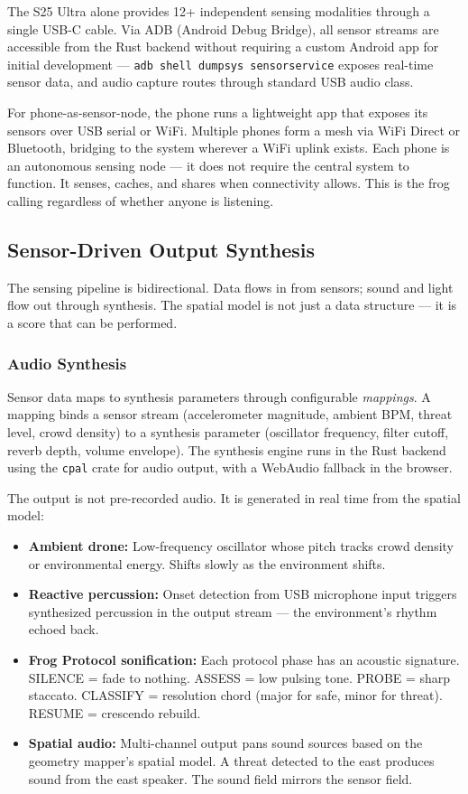 \documentclass[11pt,letterpaper]{article}
\begin{document}
The S25 Ultra alone provides 12+ independent sensing modalities through a single USB-C cable. Via ADB (Android Debug Bridge), all sensor streams are accessible from the Rust backend without requiring a custom Android app for initial development --- \texttt{adb shell dumpsys sensorservice} exposes real-time sensor data, and audio capture routes through standard USB audio class.

For phone-as-sensor-node, the phone runs a lightweight app that exposes its sensors over USB serial or WiFi. Multiple phones form a mesh via WiFi Direct or Bluetooth, bridging to the system wherever a WiFi uplink exists. Each phone is an autonomous sensing node --- it does not require the central system to function. It senses, caches, and shares when connectivity allows. This is the frog calling regardless of whether anyone is listening.

\subsection{Sensor-Driven Output Synthesis}

The sensing pipeline is bidirectional. Data flows in from sensors; sound and light flow out through synthesis. The spatial model is not just a data structure --- it is a score that can be performed.

\subsubsection{Audio Synthesis}

Sensor data maps to synthesis parameters through configurable \textit{mappings}. A mapping binds a sensor stream (accelerometer magnitude, ambient BPM, threat level, crowd density) to a synthesis parameter (oscillator frequency, filter cutoff, reverb depth, volume envelope). The synthesis engine runs in the Rust backend using the \texttt{cpal} crate for audio output, with a WebAudio fallback in the browser.

The output is not pre-recorded audio. It is generated in real time from the spatial model:

\begin{itemize}[leftmargin=2em]
\item \textbf{Ambient drone:} Low-frequency oscillator whose pitch tracks crowd density or environmental energy. Shifts slowly as the environment shifts.
\item \textbf{Reactive percussion:} Onset detection from USB microphone input triggers synthesized percussion in the output stream --- the environment's rhythm echoed back.
\item \textbf{Frog Protocol sonification:} Each protocol phase has an acoustic signature. SILENCE = fade to nothing. ASSESS = low pulsing tone. PROBE = sharp staccato. CLASSIFY = resolution chord (major for safe, minor for threat). RESUME = crescendo rebuild.
\item \textbf{Spatial audio:} Multi-channel output pans sound sources based on the geometry mapper's spatial model. A threat detected to the east produces sound from the east speaker. The sound field mirrors the sensor field.
\end{itemize}
\end{document}
